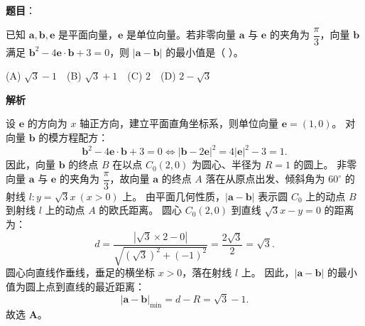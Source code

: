 \begin{answer}

\textbf{题目}：

已知 $\boldsymbol a, \boldsymbol b, \boldsymbol e$ 是平面向量，$\boldsymbol e$ 是单位向量。若非零向量 $\boldsymbol a$ 与 $\boldsymbol e$ 的夹角为 $\dfrac{\pi}{3}$，向量 $\boldsymbol b$ 满足 $\boldsymbol b^2 - 4\boldsymbol e \cdot \boldsymbol b + 3 = 0$，则 $|\boldsymbol a - \boldsymbol b|$ 的最小值是（ ）。

(A) $\sqrt3 - 1$　(B) $\sqrt3 + 1$　(C) $2$　(D) $2 - \sqrt3$

\textbf{解析}

设 $\boldsymbol e$ 的方向为 $x$ 轴正方向，建立平面直角坐标系，则单位向量 $\boldsymbol e = (1, 0)$。
对向量 $\boldsymbol b$ 的模方程配方：
\nopagebreak[4]
\[\boldsymbol b^2 - 4\boldsymbol e \cdot \boldsymbol b + 3 = 0 \iff |\boldsymbol b - 2\boldsymbol e|^2 = 4|\boldsymbol e|^2 - 3 = 1.\]
因此，向量 $\boldsymbol b$ 的终点 $B$ 在以点 $C_0(2, 0)$ 为圆心、半径为 $R = 1$ 的圆上。
非零向量 $\boldsymbol a$ 与 $\boldsymbol e$ 的夹角为 $\dfrac\pi3$，故向量 $\boldsymbol a$ 的终点 $A$ 落在从原点出发、倾斜角为 $60^\circ$ 的射线 $l\colon y = \sqrt3 x\ (x > 0)$ 上。
由平面几何性质，$|\boldsymbol a - \boldsymbol b|$ 表示圆 $C_0$ 上的动点 $B$ 到射线 $l$ 上的动点 $A$ 的欧氏距离。
圆心 $C_0(2, 0)$ 到直线 $\sqrt3 x - y = 0$ 的距离为：
\nopagebreak[4]
\[d = \dfrac{|\sqrt3 \times 2 - 0|}{\sqrt{(\sqrt3)^2 + (-1)^2}} = \dfrac{2\sqrt3}{2} = \sqrt3.\]
圆心向直线作垂线，垂足的横坐标 $x > 0$，落在射线 $l$ 上。
因此，$|\boldsymbol a - \boldsymbol b|$ 的最小值为圆上点到直线的最近距离：
\nopagebreak[4]
\[|\boldsymbol a - \boldsymbol b|_{\min} = d - R = \sqrt3 - 1.\]
故选 \textbf{A}。


\end{answer}
